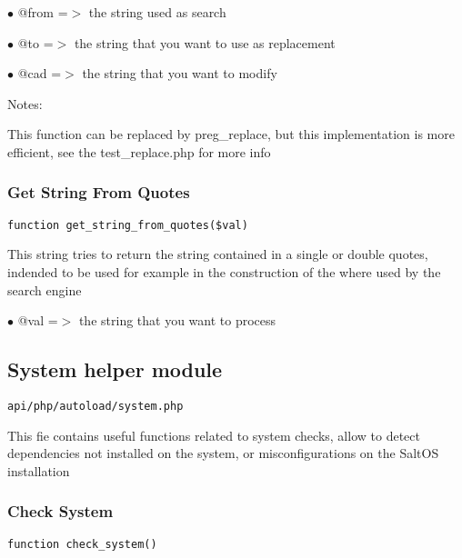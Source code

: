 \documentclass[a4paper]{article}
\begin{document}
\begin{compactitem}
\item[\color{myblue}$\bullet$] @from =$>$ the string used as search
\item[\color{myblue}$\bullet$] @to   =$>$ the string that you want to use as replacement
\item[\color{myblue}$\bullet$] @cad  =$>$ the string that you want to modify
\end{compactitem}

Notes:

This function can be replaced by preg\_replace, but this implementation is
more efficient, see the test\_replace.php for more info

\hypertarget{toc253}{}
\subsubsection{Get String From Quotes}

\begin{lstlisting}
function get_string_from_quotes($val)
\end{lstlisting}

This string tries to return the string contained in a single or double
quotes, indended to be used for example in the construction of the where
used by the search engine

\begin{compactitem}
\item[\color{myblue}$\bullet$] @val =$>$ the string that you want to process
\end{compactitem}

\hypertarget{toc254}{}
\subsection{System helper module}

\begin{lstlisting}
api/php/autoload/system.php
\end{lstlisting}

This fie contains useful functions related to system checks, allow to detect dependencies not
installed on the system, or misconfigurations on the SaltOS installation

\hypertarget{toc255}{}
\subsubsection{Check System}

\begin{lstlisting}
function check_system()
\end{lstlisting}
\end{document}
